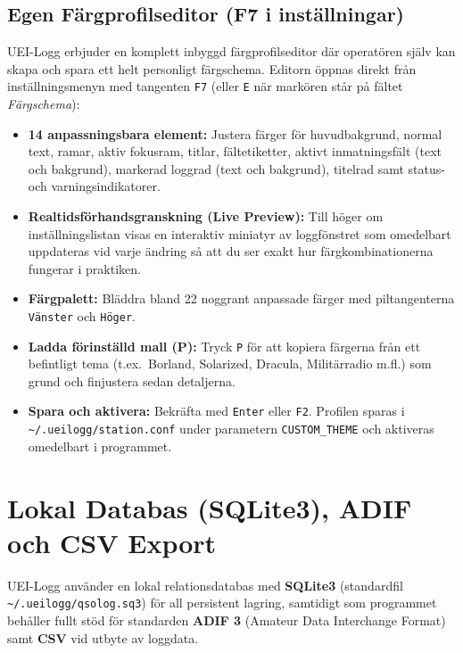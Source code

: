 \documentclass[11pt,a4paper]{article}
\begin{document}
\subsection{Egen Färgprofilseditor (F7 i inställningar)}
\label{sec:theme_editor}
UEI-Logg erbjuder en komplett inbyggd färgprofilseditor där operatören själv kan skapa och spara ett helt personligt färgschema. Editorn öppnas direkt från inställningsmenyn med tangenten \texttt{F7} (eller \texttt{E} när markören står på fältet \emph{Färgschema}):
\begin{itemize}
    \item \textbf{14 anpassningsbara element:} Justera färger för huvudbakgrund, normal text, ramar, aktiv fokusram, titlar, fältetiketter, aktivt inmatningsfält (text och bakgrund), markerad loggrad (text och bakgrund), titelrad samt status- och varningsindikatorer.
    \item \textbf{Realtidsförhandsgranskning (Live Preview):} Till höger om inställningslistan visas en interaktiv miniatyr av loggfönstret som omedelbart uppdateras vid varje ändring så att du ser exakt hur färgkombinationerna fungerar i praktiken.
    \item \textbf{Färgpalett:} Bläddra bland 22 noggrant anpassade färger med piltangenterna \texttt{Vänster} och \texttt{Höger}.
    \item \textbf{Ladda förinställd mall (P):} Tryck \texttt{P} för att kopiera färgerna från ett befintligt tema (t.ex.\ Borland, Solarized, Dracula, Militärradio m.fl.) som grund och finjustera sedan detaljerna.
    \item \textbf{Spara och aktivera:} Bekräfta med \texttt{Enter} eller \texttt{F2}. Profilen sparas i \texttt{\textasciitilde/.ueilogg/station.conf} under parametern \texttt{CUSTOM\_THEME} och aktiveras omedelbart i programmet.
\end{itemize}

\section{Lokal Databas (SQLite3), ADIF och CSV Export}
\label{sec:adif}

UEI-Logg använder en lokal relationsdatabas med \textbf{SQLite3} (standardfil \texttt{\textasciitilde/.ueilogg/qsolog.sq3}) för all persistent lagring, samtidigt som programmet behåller fullt stöd för standarden \textbf{ADIF 3} (Amateur Data Interchange Format) samt \textbf{CSV} vid utbyte av loggdata.
\end{document}
